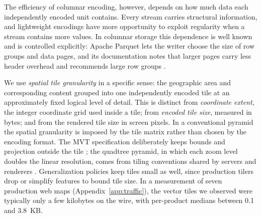 The efficiency of columnar encoding, however, depends on how much data each
independently encoded unit contains. Every stream carries structural information, and
lightweight encodings have more opportunity to exploit regularity when a stream contains
more values. In columnar storage this dependence is well known and is controlled
explicitly: Apache Parquet lets the writer choose the size of row groups and data pages,
and its documentation notes that larger pages carry less header overhead and recommends
large row groups \citep{parquet_configurations}.

We use \emph{spatial tile granularity} in a specific sense: the geographic area and
corresponding content grouped into one independently encoded tile at an approximately
fixed logical level of detail. This is distinct from \emph{coordinate extent}, the
integer coordinate grid used inside a tile; from \emph{encoded tile size}, measured in
bytes; and from the rendered tile size in screen pixels. In a conventional pyramid the
spatial granularity is imposed by the tile matrix rather than chosen by the encoding
format. The MVT specification deliberately keeps bounds and projection outside the tile
\citep{mapbox_mvt_spec_2_1}; the quadtree pyramid, in which each zoom level doubles the
linear resolution, comes from tiling conventions shared by servers and renderers
\citep{osm_slippy_tiles, ogc2022tms}. Generalization policies keep tiles small as well,
since production tilers drop or simplify features to bound tile size.
In a measurement of seven production web maps (Appendix~\ref{app:traffic}),
the vector tiles we observed were typically only a few kilobytes on the wire,
with per-product medians between 0.1 and 3.8~KB.

